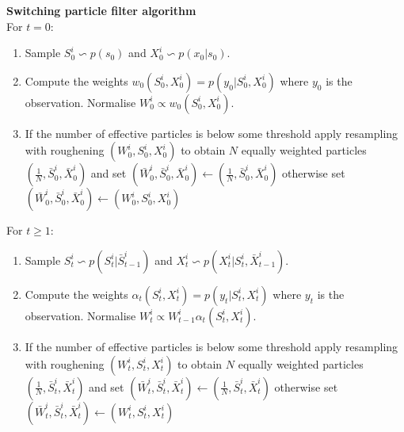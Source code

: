 \textbf{Switching particle filter algorithm}\\
For $t=0$:
\begin{enumerate}
\item
Sample $S^i_0 \backsim p(s_0)$ and $X^i_0 \backsim p(x_0|s_0)$.
\item
Compute the weights $w_0(S_0^i, X_0^i) = p(y_0|S_0^i, X_0^i)$ where $y_0$ is the observation. Normalise $W^i_0 \propto w_0(S_0^i, X_0^i)$. 
\item
If the number of effective particles is below some threshold apply resampling with roughening $(W^i_0, S^i_0, X^i_0)$ to obtain $N$ equally weighted particles $(\frac{1}{N}, \bar{S}^i_0, \bar{X}^i_0)$ and set $(\bar{W}^i_0, \bar{S}^i_0,\bar{X}^i_0) \leftarrow (\frac{1}{N}, \bar{S}^i_0, \bar{X}^i_0)$ otherwise set $(\bar{W}^i_0,\bar{S}^i_0, \bar{X}^i_0) \leftarrow ({W}^i_0, S_0^i, {X}^i_0)$
\end{enumerate}
For $t \geq 1$:
\begin{enumerate}
\item
Sample $S^i_t \backsim p(S_t^i|\bar{S}^i_{t-1})$ and $X^i_t \backsim p(X^i_t|S^i_t, \bar{X}^i_{t-1})$.
\item
Compute the weights $\alpha_t(S_t^i, X_t^i) = p(y_t|S_t^i, X_t^i)$ where $y_t$ is the observation. Normalise $W^i_t \propto W^i_{t-1}\alpha_t(S_t^i, X_t^i)$.
\item
If the number of effective particles is below some threshold apply resampling with roughening $(W^i_t, S^i_t, X^i_t)$ to obtain $N$ equally weighted particles $(\frac{1}{N}, \bar{S}^i_t, \bar{X}^i_t)$ and set $(\bar{W}^i_t, \bar{S}^i_t,\bar{X}^i_t) \leftarrow (\frac{1}{N}, \bar{S}^i_t, \bar{X}^i_t)$ otherwise set $(\bar{W}^i_t,\bar{S}^i_t, \bar{X}^i_t) \leftarrow ({W}^i_t, S_t^i, {X}^i_t)$
\end{enumerate} 

